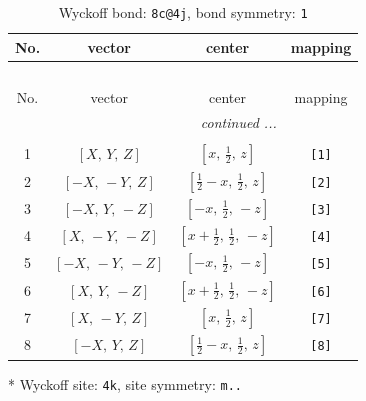 \documentclass[fleqn,8pt]{jsarticle}
\begin{document}
\renewcommand{\arraystretch}{1.2}
\begin{longtable}{cccc}
\caption{Wyckoff bond: {\tt 8c@4j}, bond symmetry: {\tt 1}}
 \\
 \hline \hline
No. & vector & center & mapping \\ \hline \endfirsthead

\multicolumn{3}{l}{\tablename\ \thetable{}} \\
 \hline \hline
No. & vector & center & mapping \\ \hline \endhead

 \hline \hline
\multicolumn{3}{r}{\footnotesize\it continued ...} \\ \endfoot

 \hline \hline
\multicolumn{3}{r}{} \\ \endlastfoot

1 & $\left[ X,\, Y,\, Z \right]$ & $\left[ x,\, \frac{1}{2},\, z \right]$ & {\tt [1]} \\ \hline
2 & $\left[ - X,\, - Y,\, Z \right]$ & $\left[ \frac{1}{2} - x,\, \frac{1}{2},\, z \right]$ & {\tt [2]} \\ \hline
3 & $\left[ - X,\, Y,\, - Z \right]$ & $\left[ - x,\, \frac{1}{2},\, - z \right]$ & {\tt [3]} \\ \hline
4 & $\left[ X,\, - Y,\, - Z \right]$ & $\left[ x + \frac{1}{2},\, \frac{1}{2},\, - z \right]$ & {\tt [4]} \\ \hline
5 & $\left[ - X,\, - Y,\, - Z \right]$ & $\left[ - x,\, \frac{1}{2},\, - z \right]$ & {\tt [5]} \\ \hline
6 & $\left[ X,\, Y,\, - Z \right]$ & $\left[ x + \frac{1}{2},\, \frac{1}{2},\, - z \right]$ & {\tt [6]} \\ \hline
7 & $\left[ X,\, - Y,\, Z \right]$ & $\left[ x,\, \frac{1}{2},\, z \right]$ & {\tt [7]} \\ \hline
8 & $\left[ - X,\, Y,\, Z \right]$ & $\left[ \frac{1}{2} - x,\, \frac{1}{2},\, z \right]$ & {\tt [8]} \\
\end{longtable}
* Wyckoff site: {\tt 4k}, site symmetry: {\tt m..}
\renewcommand{\arraystretch}{1.2}
\end{document}
